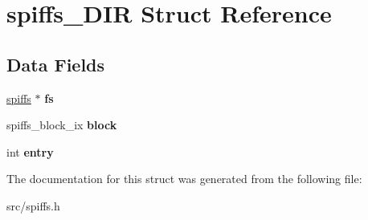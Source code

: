 \hypertarget{structspiffs___d_i_r}{}\section{spiffs\+\_\+\+D\+IR Struct Reference}
\label{structspiffs___d_i_r}
\subsection*{Data Fields}
\begin{DoxyCompactItemize}
\item 
\mbox{\label{structspiffs___d_i_r_ad006821d5233083eaf04fa13fae90d88}} 
\mbox{\hyperlink{structspiffs__t}{spiffs}} $\ast$ {\bfseries fs}
\item 
\mbox{\label{structspiffs___d_i_r_a822b1a3cdc78d84d377af471cde6cbc0}} 
spiffs\+\_\+block\+\_\+ix {\bfseries block}
\item 
\mbox{\label{structspiffs___d_i_r_a14d25754d25e2dab074381fd20395c2e}} 
int {\bfseries entry}
\end{DoxyCompactItemize}


The documentation for this struct was generated from the following file\+:\begin{DoxyCompactItemize}
\item 
src/spiffs.\+h\end{DoxyCompactItemize}
